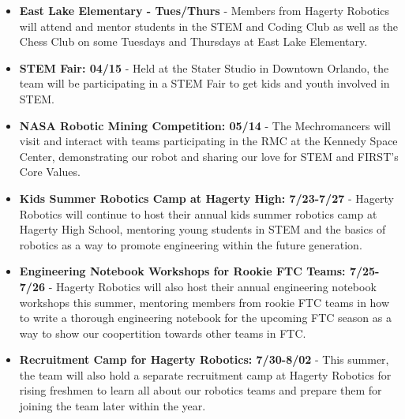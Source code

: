 \begin{itemize}
   \item \textbf{East Lake Elementary - Tues/Thurs} - Members from Hagerty Robotics will attend and mentor students in the STEM and Coding Club as well as the Chess Club on some Tuesdays and Thursdays at East Lake Elementary.
   \item \textbf{STEM Fair: 04/15} - Held at the Stater Studio in Downtown Orlando, the team will be participating in a STEM Fair to get kids and youth involved in STEM.
   \item \textbf{NASA Robotic Mining Competition: 05/14} - The Mechromancers will visit and interact with teams participating in the RMC at the Kennedy Space Center, demonstrating our robot and sharing our love for STEM and FIRST's Core Values.
	\item \textbf{Kids Summer Robotics Camp at Hagerty High: 7/23-7/27} - Hagerty Robotics will continue to host their annual kids summer robotics camp at Hagerty High School, mentoring young students in STEM and the basics of robotics as a way to promote engineering within the future generation. 
	\item \textbf{Engineering Notebook Workshops for Rookie FTC Teams: 7/25-7/26} - Hagerty Robotics will also host their annual engineering notebook workshops this summer, mentoring members from rookie FTC teams in how to write a thorough engineering notebook for the upcoming FTC season as a way to show our coopertition towards other teams in FTC. 
	\item \textbf{Recruitment Camp for Hagerty Robotics: 7/30-8/02} - This summer, the team will also hold a separate recruitment camp at Hagerty Robotics for rising freshmen to learn all about our robotics teams and prepare them for joining the team later within the year. 
\end{itemize}